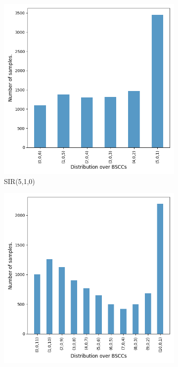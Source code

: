 \begin{figure}[H]
    \centering
    \begin{subfigure}{0.3\textwidth}
        \centering
        \includegraphics[width=\linewidth]{figures/sir510_data.png}
        \caption{SIR(5,1,0)}
    \end{subfigure}
    \hfill
    \begin{subfigure}{0.3\textwidth}
        \centering
        \includegraphics[width=\linewidth]{figures/sir1010_data.png}

\end{subfigure}
\end{figure}
